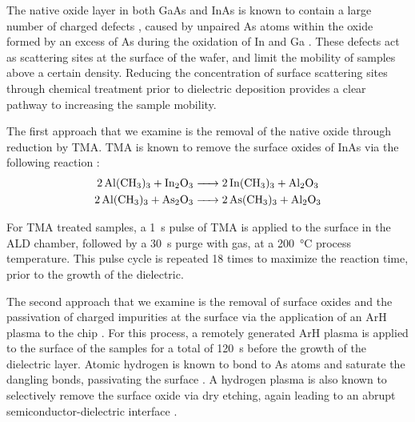 The native oxide layer in both GaAs and InAs is known to contain a large number of charged defects \cite{doi:10.1063/1.5054292,PhysRevB.49.11159}, caused by unpaired As atoms within the oxide formed by an excess of As during the oxidation of In and Ga \cite{doi:10.1063/1.3369540,Affentauschegg_2001}. These defects act as scattering sites at the surface of the wafer, and limit the mobility of samples above a certain density. Reducing the concentration of surface scattering sites through chemical treatment prior to dielectric deposition provides a clear pathway to increasing the sample mobility.

The first approach that we examine is the removal of the native oxide through reduction by TMA\cite{doi:10.1063/1.3148723,Tallarida_2012,CLEVELAND2013167}.
TMA is known to remove the surface oxides of InAs via the following reaction \cite{iiiv_cleanup}:
\begin{align}
    \ce{2Al(CH3)3 + In2O3 &-> 2In(CH3)3 + Al2O3} \\
    \ce{2Al(CH3)3 + As2O3 &-> 2As(CH3)3 + Al2O3}
\end{align}

For TMA treated samples, a \SI{1}{\second} pulse of TMA is applied to the surface in the ALD chamber, followed by a \SI{30}{\second} purge with  gas, at a \SI{200}{\celsius} process temperature. This pulse cycle is repeated 18 times to maximize the reaction time, prior to the growth of the dielectric.

The second approach that we examine is the removal of surface oxides and the passivation of charged impurities at the surface via the application of an ArH plasma to the chip \cite{CLEVELAND2013167,BELL1998125,doi:10.1116/1.586538}. For this process, a remotely generated ArH plasma is applied to the surface of the samples for a total of \SI{120}{\second} before the growth of the dielectric layer. Atomic hydrogen is known to bond to As atoms and saturate the dangling bonds, passivating the surface \cite{BELL1998125}. A hydrogen plasma is also known to selectively remove the surface oxide via dry etching, again leading to an abrupt semiconductor-dielectric interface \cite{doi:10.1063/1.92194,doi:10.1063/1.100961}.

